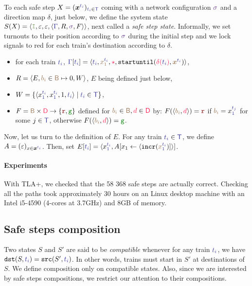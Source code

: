 \documentclass[runningheads]{llncs}
\newcommand{\tuple}[1]{\ensuremath{\langle #1\rangle}}
\newcommand{\directions}{\dirFmt{\mathsf{D}}}
\newcommand{\dirFmt}[1]{{\color{dircolor} #1}}
\newcommand{\dirStop}{\ensuremath{\dirFmt{\star}}\xspace}
\newcommand{\posFmt}[1]{{\color{poscolor}{#1}}}
\newcommand{\blocks}{{\posFmt{\mathsf{B}}}}
\newcommand{\bid}[1]{\ensuremath{\posFmt{b_{#1}}}}
\newcommand{\swFmt}[1]{{\color{swcolor}{#1}}}
\newcommand{\switches}{\ensuremath{\swFmt{\sigma}}}
\newcommand{\trainFmt}[1]{{\color{traincolor} #1}}
\newcommand{\trainTuple}[4]{\langle \trainFmt{#1}, \posFmt{#2}, \dirFmt{#3}, #4 \rangle}
\newcommand{\trainSeq}{\ensuremath{\trainFmt{\Gamma}}\xspace}
\newcommand{\trains}{{\trainFmt{\mathsf{T}}}}
\newcommand{\tid}[1]{\ensuremath{\trainFmt{t_{#1}}}}
\newcommand{\su}[2]{{\mbox{$\mathtt{startuntil}(\dirFmt{#1}, \posFmt{#2})$}}\xspace}
\newcommand{\incr}[1]{{\mbox{\ensuremath{\mathtt{incr}(\posFmt{#1})}}}\xspace}
\newcommand{\regulator}{\ensuremath{R}}
\newcommand{\sigred}{{\mbox{${\color{red!50!black}\mathtt{r}}$}}\xspace}
\newcommand{\siggreen}{{\mbox{${\color{green!50!black}\mathtt{g}}$}}\xspace}
\newcommand{\signals}{\ensuremath{F}}
\newcommand{\stateTuple}[4]{\tuple{#1, #2, #3, #4}}
\newcommand{\guardFmt}[1]{{\color{guardcolor} \ensuremath{\mathtt{#1}}}}
\newcommand{\guardI}{\guardFmt{I}}
\newcommand{\bufferFmt}[1]{#1}
\newcommand{\emptyList}{\ensuremath{\varepsilon}}
\newcommand{\redTuple}[4]{\ensuremath{\tuple{#1, \bufferFmt{#2}, \bufferFmt{#3}, #4}}}
\begin{document}
To each safe step $X = (\vec{x}^{\tid{i}})_{\tid{i} \in \trains}$ coming with a network configuration $\switches$ and a direction map $\delta$, just below, we define the system state $S(X) = \redTuple{\guardI}{ \emptyList}{ \emptyList}{\stateTuple{\trainSeq{}}{\regulator}{\switches}{\signals}}$, next called a \emph{safe step state}. Informally, we set turnouts to their position according to $\switches$ during the initial step  and we lock signals to red for each train's destination according to $\delta$. 
\begin{itemize}
\item for each train $\tid{i}$, $\trainSeq[\tid{i}] = \trainTuple{\tid{i}}{x_1^{\tid{i}}}{\dirStop}{\su{\delta(\tid{i})}{\vec{x}^{\tid{i}}}}$,
\item $R = \langle E,  \bid{i} \in \blocks \mapsto 0, W\rangle$, $E$ being defined just below,
\item $W = \{ \tuple{x_1^\tid{i}, x_1^\tid{i}, 1, \tid{i}}  \mid \tid{i} \in \trains \}$, 
\item $F = \blocks \times \directions \to \{\sigred, \siggreen \}$ defined for $\bid{i} \in \blocks, \dirFmt{d} \in \directions$ by: $F(\langle \bid{i}, \dirFmt{d}\rangle) = \sigred$ if  $\bid{i} = x_1^\tid{j}$ for some $j\in \trains$, otherwise $F(\langle \bid{i}, \dirFmt{d}\rangle)  = \siggreen$. 
\end{itemize}

Now, let us turn to the definition of $E$. For any train $\tid{i} \in \trains$, we define $A= (\emptyList)_{x \in \vec{x}^\tid{i} }$. Then, set  $E[\tid{i}] = \langle x_1^\tid{i}, A[x_1 \leftarrow \langle \incr{x_1^\tid{i}}] \rangle]$. 

\paragraph{Experiments}  With TLA+, we checked that the 58 368 safe steps are actually correct. Checking all the paths took approximately 30 hours on an Linux desktop machine with an Intel i5-4590 (4-cores at 3.7GHz) and 8GB of memory.

\subsection{Safe steps composition}

Two states $S$ and $S'$ are said to be \emph{compatible} whenever  for any train $\tid{i}$, we have $\mathtt{dst}(S, \tid{i})  =  \mathtt{src}(S', \tid{i})$. In other words, trains must start in $S'$ at destinations of $S$. We define composition only on compatible states. Also, since we are interested by safe steps compositions, we restrict our attention to their compositions.
  
\end{document}
